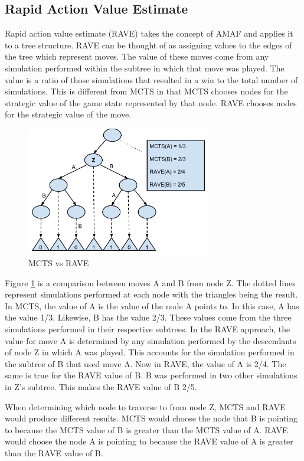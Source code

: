 \documentclass{sig-alternate}
\begin{document}
\subsection{Rapid Action Value Estimate}
Rapid action value estimate (RAVE) takes the concept of AMAF and applies it to a tree structure. RAVE can be thought of as assigning values to the edges of the tree which represent moves. The value of these moves come from any simulation performed within the subtree in which that move was played. The value is a ratio of those simulations that resulted in a win to the total number of simulations. This is different from MCTS in that MCTS chooses nodes for the strategic value of the game state represented by that node. RAVE chooses nodes for the strategic value of the move.

\begin{figure}[h]
	\includegraphics[width=8cm]{RAVEDiagram.pdf}
	\centering
	\caption{MCTS vs RAVE}
	\label{fig:RAVEDiagram}
\end{figure}

Figure \ref{fig:RAVEDiagram} is a comparison between moves A and B from node Z. The dotted lines represent simulations performed at each node with the triangles being the result. In MCTS, the value of A is the value of the node A points to. In this case, A has the value 1/3. Likewise, B has the value 2/3. These values come from the three simulations performed in their respective subtrees. In the RAVE approach, the value for move A is determined by any simulation performed by the descendants of node Z in which A was played. This accounts for the simulation performed in the subtree of B that used move A. Now in RAVE, the value of A is 2/4. The same is true for the RAVE value of B. B was performed in two other simulations in Z's subtree. This makes the RAVE value of B 2/5.

When determining which node to traverse to from node Z, MCTS and RAVE would produce different results. MCTS would choose the node that B is pointing to because the MCTS value of B is greater than the MCTS value of A. RAVE would choose the node A is pointing to because the RAVE value of A is greater than the RAVE value of B.   
\end{document}
